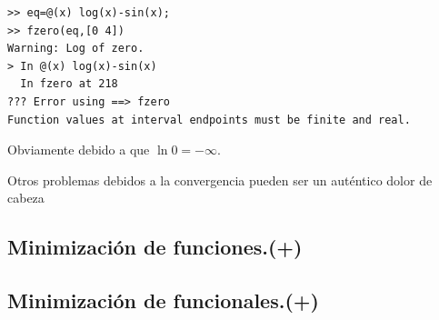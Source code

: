   \begin{verbatim}
>> eq=@(x) log(x)-sin(x);
>> fzero(eq,[0 4])
Warning: Log of zero.
> In @(x) log(x)-sin(x)
  In fzero at 218
??? Error using ==> fzero
Function values at interval endpoints must be finite and real.
\end{verbatim}
Obviamente debido a que $\ln0=-\infty$.

Otros problemas debidos a la convergencia pueden ser un auténtico
dolor de cabeza


\subsection{Minimización de funciones.(+)}


\subsection{Minimización de funcionales.(+)}
